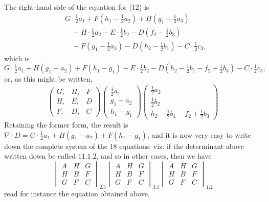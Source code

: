 \documentclass[11pt,a4paper]{article}
\theoremstyle{definition}
\theoremstyle{remark}
\begin{document}
The right-hand side of the equation for (12) is
\[
\begin{aligned}
& G \cdot \tfrac{1}{2}a_1 + F(h_1 - \tfrac{1}{2}a_2) + H(g_1 - \tfrac{1}{2}a_3) \\
&\quad - H \cdot \tfrac{1}{2}a_2 - E \cdot \tfrac{1}{2}b_2 - D(f_2 - \tfrac{1}{2}b_3) \\
&\quad - F(g_1 - \tfrac{1}{2}a_3) - D(h_2 - \tfrac{1}{2}b_1) - C \cdot \tfrac{1}{2}c_3,
\end{aligned}
\]
which is
\[
G \cdot \tfrac{1}{2}a_1 + H(g_1 - a_2) + F(h_1 - g_1) - E \cdot \tfrac{1}{2}b_2 - D(h_2 - \tfrac{1}{2}b_1 - f_2 + \tfrac{1}{2}b_3) - C \cdot \tfrac{1}{2}c_3,
\]
or, as this might be written,
\[
\begin{pmatrix}
G, & H, & F \\
H, & E, & D \\
F, & D, & C
\end{pmatrix}
\begin{pmatrix}
\tfrac{1}{2}a_1 \\ g_1 - a_2 \\ h_1 - g_1
\end{pmatrix}
\begin{pmatrix}
\tfrac{1}{2}a_2 \\ \tfrac{1}{2}b_2 \\ h_2 - \tfrac{1}{2}b_1 - f_2 + \tfrac{1}{2}b_3
\end{pmatrix}
\]
Retaining the former form, the result is $\nabla \cdot D = G \cdot \tfrac{1}{2}a_1 + H(g_1 - a_2) + F(h_1 - g_1)$, and it is now very easy to write down the complete system of the 18 equations; viz. if the determinant above written down be called $11.1.2$, and so in other cases, then we have
\[
\begin{vmatrix}
A & H & G \\
H & B & F \\
G & F & C
\end{vmatrix}_{2.3}
\begin{vmatrix}
A & H & G \\
H & B & F \\
G & F & C
\end{vmatrix}_{3.1}
\begin{vmatrix}
A & H & G \\
H & B & F \\
G & F & C
\end{vmatrix}_{1.2}
\]
read for instance the equation obtained above.
\end{document}
